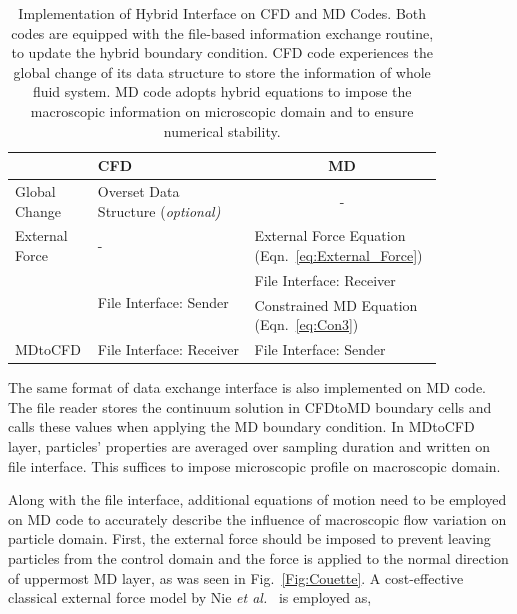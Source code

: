 \documentclass[preprint,12pt]{elsarticle}
\begin{document}
\begin{table}
  \caption{\small Implementation of Hybrid Interface on CFD and MD Codes. Both codes are equipped with the file-based information exchange routine, to update the hybrid boundary condition. CFD code experiences the global change of its data structure to store the information of whole fluid system. MD code adopts hybrid equations to impose the macroscopic information on microscopic domain and to ensure numerical stability.}
  \label{table:interface_implementation}
  \centering
  \resizebox{0.8\linewidth}{!} {
  \begin{tabular}{>{\centering}p{0.15\linewidth} || p{0.35\linewidth} | p{0.35\linewidth} }
\hline
  & \centering CFD & \multicolumn{1}{c}{MD} \\
\hline
 Global Change & Overset Data Structure (\it{optional}) & \multicolumn{1}{c}{-} \\
\hline
 \centering External Force & \centering - & External Force Equation (Eqn.~\ref{eq:External_Force}) \\
\hline
 \multirow{2}{*}{CFDtoMD} &  \multirow{2}{*}{File Interface: Sender} & {File Interface: Receiver} \\
 & & Constrained MD Equation (Eqn.~\ref{eq:Con3}) \\
\hline
 MDtoCFD & File Interface: Receiver & File Interface: Sender \\
\hline
\end{tabular} }
\vspace{-1em}
\end{table}


The same format of data exchange interface is also implemented on MD code. The file reader stores the continuum solution in CFDtoMD boundary cells and calls these values when applying the MD boundary condition. In MDtoCFD layer, particles' properties are averaged over sampling duration and written on file interface. This suffices to impose microscopic profile on macroscopic domain.

Along with the file interface, additional equations of motion need to be employed on MD code to accurately describe the influence of macroscopic flow variation on particle domain. First, the external force should be imposed to prevent leaving particles from the control domain and the force is applied to the normal direction of uppermost MD layer, as was seen in Fig.~\ref{Fig:Couette}. A cost-effective classical external force model by Nie {\it{et al.}}~\cite{Nie} is employed as,
\end{document}
